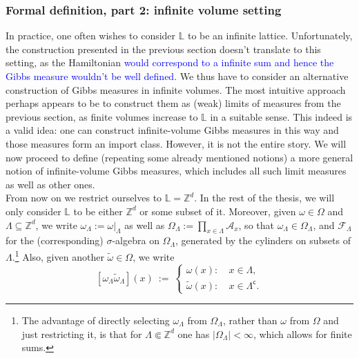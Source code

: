 \documentclass[12pt]{article}
\newcommand{\A}{\mathcal{A}}
\newcommand{\F}{\mathcal{F}}
\renewcommand{\L}{\mathbb{L}}
\newcommand{\Z}{\mathbb{Z}}
\newcommand{\1}{\mathbbm{1}}
\renewcommand{\c}{\mathsf{c}}
\newcommand{\5}{\vspace{0.5cm}}
\renewcommand{\tilde}{\widetilde}
\theoremstyle{definition}
\begin{document}
\subsubsection{Formal definition, part 2: infinite volume setting}

In practice, one often wishes to consider $\L$ to be an infinite lattice. Unfortunately, the construction presented in the previous section doesn't translate to this setting, as the Hamiltonian \textcolor{blue}{would correspond to a infinite sum and hence the Gibbs measure wouldn't be well defined.} We thus have to consider an alternative construction of Gibbs measures in infinite volumes. The most intuitive approach perhaps appears to be to construct them as (weak) limits of measures from the previous section, as finite volumes increase to $\L$ in a suitable sense. This indeed is a valid idea: one can construct infinite-volume Gibbs measures in this way and those measures form an import class. However, it is not the entire story. We will now proceed to define (repeating some already mentioned notions) a more general notion of infinite-volume Gibbs measures, which includes all such limit measures as well as other ones. \\

From now on we restrict ourselves to $\L=\Z^d$. In the rest of the thesis, we will only consider $\L$ to be either $\Z^d$ or some subset of it. Moreover, given $\omega\in\Omega$ and $\Lambda\subseteq\Z^d$, we write $\omega_\Lambda:=\omega|_\Lambda$ as well as $\Omega_\Lambda:=\prod_{x\in\Lambda}\A_x$, so that $\omega_\Lambda\in\Omega_\Lambda$, and $\F_\Lambda$ for the (corresponding) $\sigma$-algebra on $\Omega_\Lambda$, generated by the cylinders on subsets of $\Lambda$.\footnote{The advantage of directly selecting $\omega_\Lambda$ from $\Omega_\Lambda$, rather than $\omega$ from $\Omega$ and just restricting it, is that for $\Lambda\Subset\Z^d$ one has $|\Omega_\Lambda|<\infty$, which allows for finite sums.} Also, given another $\tilde{\omega}\in\Omega$, we write $$[\omega_\Lambda\tilde{\omega}_\Lambda](x) ~:=~ \begin{cases}
\omega(x): ~&x\in\Lambda,\\
\tilde{\omega}(x): ~&x\in\Lambda^\c.
\end{cases}$$
\end{document}
